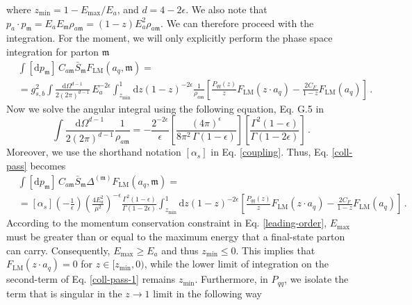 \documentclass[a4paper, 12pt]{book}
\newcommand{\um}{\mathfrak{m}}
\begin{document}
where $z_{\mathrm{min}} = 1 - E_{\mathrm{max}}/E_a$, and $d=4-2\epsilon$. We also note that $p_a \cdot p_\um = E_a E_\um \rho_{a\um}=(1-z)E_a^2\rho_{a \um}$. We can therefore proceed with the integration. For the moment, we will only explicitly perform the phase space integration for parton $\um$
\begin{equation}
  \begin{split}
  & \int [\mathrm{d}p_\um] \, C_{a\um} \bar{S}_\um F_{\mathrm{LM}} (a_q, \um) = \\
  & = g^2_{s,b}  \int \frac{\mathrm{d}\Omega ^{d-1}}{2 (2\pi)^{d-1}} \, E_a^{-2\epsilon} \int_{z_{\mathrm{min}}}^{1} \mathrm{d}z (1-z)^{-2\epsilon} \frac{1}{ \rho_{a \um}} \left[\frac{P_{qq}(z)}{z} F_{\mathrm{LM}}(z \cdot a_q) - \frac{2 C_F}{1-z}F_{\mathrm{LM}} (a_q) \right] \, .
  \label{coll-pass}
  \end{split}
\end{equation}
Now we solve the angular integral using the following equation, Eq. G.5 in \cite{Asteriadis:1910}
\begin{equation}
  \int \frac{\mathrm{d}\Omega ^{d-1}}{2 (2\pi)^{d-1}} \frac{1}{\rho_{a \um}}= -\frac{2^{-2\epsilon}}{\epsilon} \left[ \frac{(4\pi)^{\epsilon}}{8\pi^2 \, \Gamma(1-\epsilon)}\right] \left[\frac{\Gamma^2(1-\epsilon)}{\Gamma(1-2\epsilon)} \right] \, .
  \label{angular-integral}
\end{equation}
Moreover, we use the shorthand notation $[\alpha_s]$ in Eq. \ref{coupling}. Thus, Eq. \ref{coll-pass} becomes
\begin{equation}
  \begin{split}
  & \int [\mathrm{d}p_\um] \, C_{a\um} \bar{S}_\um \Delta^{(\um)} F_{\mathrm{LM}} (a_q, \um) = \\
  & = [\alpha_s] \left(-\frac{1}{\epsilon}\right) \left(\frac{4E_a^2}{\mu^2}\right)^{-\epsilon} \frac{\Gamma^2(1-\epsilon)}{\Gamma(1-2\epsilon)} \int_{z_{\mathrm{min}}}^{1} \mathrm{d}z (1-z)^{-2\epsilon} \left[ \frac{P_{qq}(z)}{z} F_{\mathrm{LM}}(z \cdot a_q) - \frac{2 C_F}{1-z}F_{\mathrm{LM}} (a_q) \right] \,.
  \label{coll-pass-1}
  \end{split}
\end{equation}
According to the momentum conservation constraint in Eq. \ref{leading-order}, $E_{\max}$ must be greater than or equal to the maximum energy that a final-state parton can carry. Consequently, $E_{\max} \geq E_a$ and thus $z_{\mathrm{min}} \leq 0$. This implies that $F_{\mathrm{LM}}(z \cdot a_q) = 0$ for $z \in \big[z_{\mathrm{min}}, 0 \big)$,  while the lower limit of integration on the second-term of Eq. \ref{coll-pass-1} remains $z_{\mathrm{min}}$. Furthermore, in $P_{qq}$, we isolate the term that is singular in the $z \to 1$ limit in the following way
\end{document}
